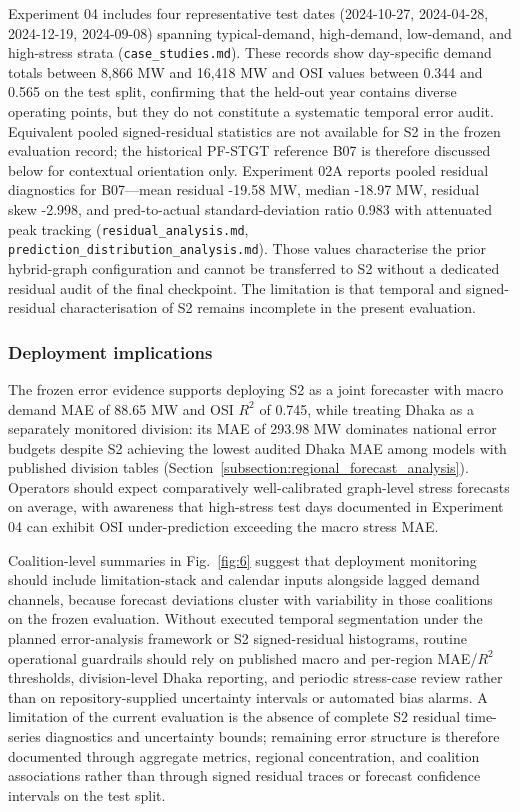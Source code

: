 Experiment 04 includes four representative test dates (2024-10-27, 2024-04-28, 2024-12-19, 2024-09-08) spanning typical-demand, high-demand, low-demand, and high-stress strata (\texttt{case\_studies.md}). These records show day-specific demand totals between 8,866 MW and 16,418 MW and OSI values between 0.344 and 0.565 on the test split, confirming that the held-out year contains diverse operating points, but they do not constitute a systematic temporal error audit. Equivalent pooled signed-residual statistics are not available for S2 in the frozen evaluation record; the historical PF-STGT reference B07 is therefore discussed below for contextual orientation only. Experiment 02A reports pooled residual diagnostics for B07---mean residual -19.58 MW, median -18.97 MW, residual skew -2.998, and pred-to-actual standard-deviation ratio 0.983 with attenuated peak tracking (\texttt{residual\_analysis.md}, \texttt{prediction\_distribution\_analysis.md}). Those values characterise the prior hybrid-graph configuration and cannot be transferred to S2 without a dedicated residual audit of the final checkpoint. The limitation is that temporal and signed-residual characterisation of S2 remains incomplete in the present evaluation.

\subsubsection{Deployment implications}\label{subsubsection:deployment_implications}

The frozen error evidence supports deploying S2 as a joint forecaster with macro demand MAE of 88.65 MW and OSI $R^2$ of 0.745, while treating Dhaka as a separately monitored division: its MAE of 293.98 MW dominates national error budgets despite S2 achieving the lowest audited Dhaka MAE among models with published division tables (Section~\ref{subsection:regional_forecast_analysis}). Operators should expect comparatively well-calibrated graph-level stress forecasts on average, with awareness that high-stress test days documented in Experiment 04 can exhibit OSI under-prediction exceeding the macro stress MAE.

Coalition-level summaries in Fig.~\ref{fig:6} suggest that deployment monitoring should include limitation-stack and calendar inputs alongside lagged demand channels, because forecast deviations cluster with variability in those coalitions on the frozen evaluation. Without executed temporal segmentation under the planned error-analysis framework or S2 signed-residual histograms, routine operational guardrails should rely on published macro and per-region MAE/$R^2$ thresholds, division-level Dhaka reporting, and periodic stress-case review rather than on repository-supplied uncertainty intervals or automated bias alarms. A limitation of the current evaluation is the absence of complete S2 residual time-series diagnostics and uncertainty bounds; remaining error structure is therefore documented through aggregate metrics, regional concentration, and coalition associations rather than through signed residual traces or forecast confidence intervals on the test split.

